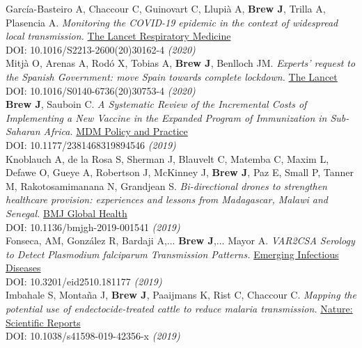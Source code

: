 \documentclass[11pt]{article}
\begin{document}
{{\noindent García-Basteiro A, Chaccour C, Guinovart C, Llupià A, \textbf{Brew J}, Trilla A, Plasencia A. \emph{Monitoring the COVID-19 epidemic in the context of widespread local transmission.} \href{https://www.thelancet.com/journals/lanres/article/PIIS2213-2600(20)30162-4/fulltext}{The Lancet Respiratory Medicine} \\ DOI: 10.1016/S2213-2600(20)30162-4 \hfill \emph{(2020)} \\


\noindent Mitjà O, Arenas A, Rodó X, Tobias A, \textbf{Brew J}, Benlloch JM. \emph{Experts' request to the Spanish Government: move Spain towards complete lockdown.} \href{https://www.thelancet.com/pb-assets/Lancet/pdfs/S0140673620307534.pdf}{The Lancet} \\ DOI: 10.1016/S0140-6736(20)30753-4 \hfill \emph{(2020)} \\


\noindent \textbf{Brew J}, Sauboin C. \emph{A Systematic Review of the Incremental Costs of Implementing a New Vaccine in the Expanded Program of Immunization in Sub-Saharan Africa.} \href{https://doi.org/10.1177/2381468319894546}{MDM Policy and Practice} \\ DOI: 10.1177/2381468319894546 \hfill \emph{(2019)} \\

\noindent Knoblauch A, de la Rosa S, Sherman J, Blauvelt C, Matemba C, Maxim L, Defawe O, Gueye A, Robertson J, McKinney J, \textbf{Brew J}, Paz E, Small P, Tanner M, Rakotosamimanana N, Grandjean S. \emph{Bi-directional drones to strengthen healthcare provision: experiences and lessons from Madagascar, Malawi and Senegal.} \href{https://dx.doi.org/10.1136/bmjgh-2019-001541}{BMJ Global Health} \\ DOI: 10.1136/bmjgh-2019-001541 \hfill \emph{(2019)} \\


\noindent Fonseca, AM, González R, Bardaji A,... \textbf{Brew J},... Mayor A. \emph{VAR2CSA Serology to Detect Plasmodium falciparum Transmission Patterns.} \href{https://wwwnc.cdc.gov/eid/article/25/10/18-1177_article}{Emerging Infectious Diseases} \\ DOI: 10.3201/eid2510.181177 \hfill \emph{(2019)} \\  


\noindent Imbahale S, Montaña J, \textbf{Brew J}, Paaijmans K, Rist C, Chaccour C. \emph{Mapping the potential use of endectocide-treated cattle to reduce malaria transmission.} \href{www.nature.com/articles/s41598-019-42356-x}{Nature: Scientific Reports} \\ DOI: 10.1038/s41598-019-42356-x \hfill \emph{(2019)} \\


}}
\end{document}
